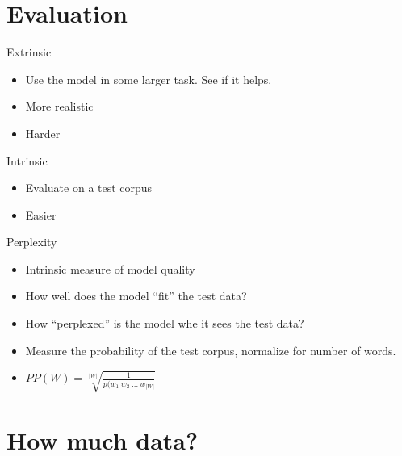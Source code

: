 \documentclass[11pt,letterpaper]{article}
\begin{document}
\section{Evaluation}

Extrinsic

\begin{itemize}
  \item Use the model in some larger task.  See if it helps.
  \item More realistic
  \item Harder
\end{itemize}

Intrinsic

\begin{itemize}
  \item Evaluate on a test corpus
  \item Easier
\end{itemize}

Perplexity

\begin{itemize}
  \item Intrinsic measure of model quality
  \item How well does the model ``fit'' the test data?
  \item How ``perplexed'' is the model whe it sees the test data?
  \item Measure the probability of the test corpus, normalize for number of words.
  \item $PP(W) = \sqrt[|W|]{\frac{1}{p(w_1~w_2~...~w_{|W|}}}$
\end{itemize}



\section{How much data?}
\end{document}
